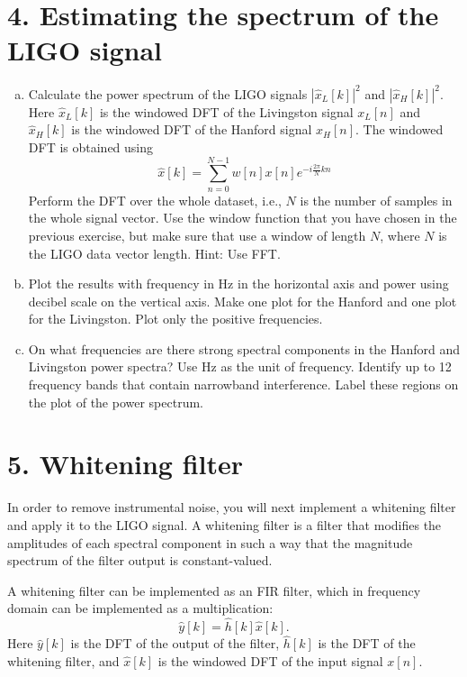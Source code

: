 \section{4. Estimating the spectrum of the LIGO signal}

\begin{enumerate}[a)]
  \item Calculate the power spectrum of the LIGO signals
        $|\hat{x}_L[k]|^2$ and $|\hat{x}_H[k]|^2$. Here $\hat{x}_L[k]$ is the
        windowed DFT of the Livingston signal $x_L[n]$ and $\hat{x}_H[k]$ is
        the windowed DFT of the Hanford signal $x_H[n]$. The windowed DFT is
        obtained using
        \begin{equation}
          \hat{x}[k] = \sum_{n=0}^{N-1} w[n]x[n]e^{-i\frac{2\pi}{N}kn}
          \label{dfteq}
        \end{equation}
        Perform the DFT over the whole dataset, i.e., $N$ is the number of samples in the whole
        signal vector. Use the window function that you have chosen in the previous exercise,
        but make sure that use a window of length $N$, where $N$ is the LIGO data vector length. Hint: Use FFT.

  \item Plot the results with frequency in Hz in the horizontal axis and
        power using decibel scale on the vertical axis. Make one
        plot for the Hanford and one plot for the Livingston. Plot only the positive frequencies.

  \item On what frequencies are there strong spectral components in the
        Hanford and Livingston power spectra? Use Hz as the unit of
        frequency. Identify up to 12 frequency bands that contain narrowband interference.
        Label these regions on the plot of the power spectrum.

\end{enumerate}

\section{5. Whitening filter}

In order to remove instrumental noise, you will next implement a
whitening filter and apply it to the LIGO signal. A whitening filter
is a filter that modifies the amplitudes of each spectral component in
such a way that the magnitude spectrum of the filter output is constant-valued.

A whitening filter can be implemented as an FIR filter, which in frequency domain
can be implemented as a multiplication:
\begin{equation}
  \hat{y}[k] = \hat{h}[k]\hat{x}[k].
\end{equation}
Here $\hat{y}[k]$ is the DFT of the output of the filter, $\hat{h}[k]$ is the DFT of
the whitening filter, and $\hat{x}[k]$ is the windowed DFT of the input signal $x[n]$.

